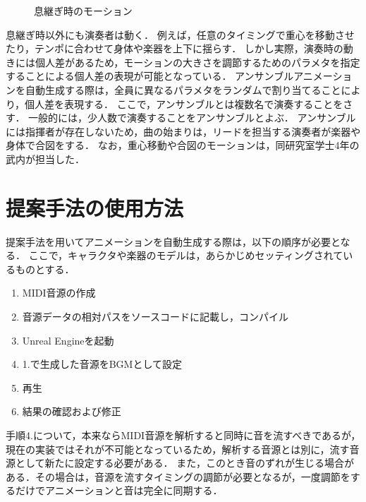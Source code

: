 \begin{figure}[!h]
	\caption{息継ぎ時のモーション}
	\label{fig:breath_motion}
\vspace{10mm}
\end{figure}
\indent
息継ぎ時以外にも演奏者は動く．
例えば，任意のタイミングで重心を移動させたり，テンポに合わせて身体や楽器を上下に揺らす．
しかし実際，演奏時の動きには個人差があるため，モーションの大きさを調節するためのパラメタを指定することによる個人差の表現が可能となっている．
アンサンブルアニメーションを自動生成する際は，全員に異なるパラメタをランダムで割り当てることにより，個人差を表現する．
ここで，アンサンブルとは複数名で演奏することをさす．
一般的には，少人数で演奏することをアンサンブルとよぶ．
アンサンブルには指揮者が存在しないため，曲の始まりは，リードを担当する演奏者が楽器や身体で合図をする．
なお，重心移動や合図のモーションは，同研究室学士4年の武内が担当した．


\section{提案手法の使用方法} \label{sec:howto}
提案手法を用いてアニメーションを自動生成する際は，以下の順序が必要となる．
ここで，キャラクタや楽器のモデルは，あらかじめセッティングされているものとする．
\newpage
\begin{enumerate}
	\item MIDI音源の作成
	\item 音源データの相対パスをソースコードに記載し，コンパイル
	\item Unreal Engineを起動
	\item 1.で生成した音源をBGMとして設定
	\item 再生
	\item 結果の確認および修正
\end{enumerate}\par
手順4.について，本来ならMIDI音源を解析すると同時に音を流すべきであるが，現在の実装ではそれが不可能となっているため，解析する音源とは別に，流す音源として新たに設定する必要がある．
また，このとき音のずれが生じる場合がある．その場合は，音源を流すタイミングの調節が必要となるが，一度調節をするだけでアニメーションと音は完全に同期する．